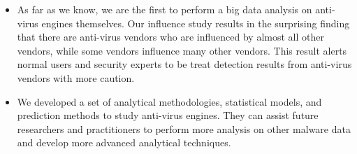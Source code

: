 \begin{itemize}

\item
As far as we know, we are the first to perform a big data analysis on anti-virus engines themselves.
Our influence study results in the surprising finding that there are anti-virus vendors who are influenced by almost all other vendors,
while some vendors influence many other vendors. 
This result alerts normal users and security experts to be treat detection results from anti-virus vendors with more caution.

\item
We developed a set of analytical methodologies, statistical models, and prediction methods to study anti-virus engines.
They can assist future researchers and practitioners to perform more analysis 
on other malware data and develop more advanced analytical techniques.


\end{itemize}

